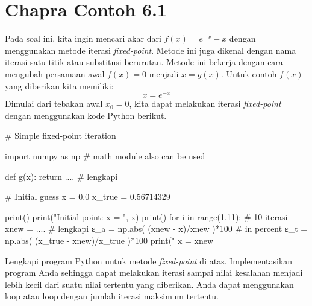 \section{Chapra Contoh 6.1}

Pada soal ini, kita ingin mencari akar dari $f(x) = e^{-x} - x$ dengan
menggunakan metode iterasi \textit{fixed-point}. Metode ini juga dikenal
dengan nama iterasi satu titik atau substitusi berurutan. Metode ini
bekerja dengan cara mengubah persamaan awal $f(x) = 0$ menjadi
$x = g(x)$. Untuk contoh $f(x)$ yang diberikan kita memiliki:
\begin{equation*}
x = e^{-x}
\end{equation*}
Dimulai dari tebakan awal $x_{0} = 0$, kita dapat melakukan iterasi
\textit{fixed-point} dengan menggunakan kode Python berikut.

\begin{pythoncode}
# Simple fixed-point iteration
    
import numpy as np # math module also can be used
    
def g(x):
    return .... # lengkapi
    
# Initial guess
x = 0.0
x_true = 0.56714329
    
print()
print("Initial point: x = ", x)
print()
for i in range(1,11): # 10 iterasi
    xnew = .... # lengkapi
    ε_a = np.abs( (xnew - x)/xnew )*100 # in percent
    ε_t = np.abs( (x_true - xnew)/x_true )*100
    print("%
    x = xnew    
\end{pythoncode}

\begin{soal}
Lengkapi program Python untuk metode \textit{fixed-point} di atas.
Implementasikan program Anda sehingga
dapat melakukan iterasi sampai nilai kesalahan menjadi lebih kecil dari
suatu nilai tertentu yang diberikan. Anda dapat menggunakan loop 
atau loop  dengan jumlah iterasi maksimum tertentu.
\end{soal}

